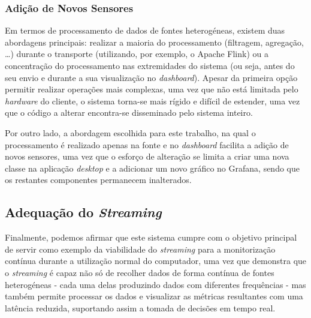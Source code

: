 \subsubsection{Adição de Novos Sensores}

Em termos de processamento de dados de fontes heterogéneas, existem duas abordagens principais: realizar a maioria do processamento (filtragem, agregação, \ldots) durante o transporte (utilizando, por exemplo, o Apache Flink) ou a concentração do processamento nas extremidades do sistema (ou seja, antes do seu envio e durante a sua visualização no \textit{dashboard}).
Apesar da primeira opção permitir realizar operações mais complexas, uma vez que não está limitada pelo \textit{hardware} do cliente, o sistema torna-se mais rígido e difícil de estender, uma vez que o código a alterar encontra-se disseminado pelo sistema inteiro.

Por outro lado, a abordagem escolhida para este trabalho, na qual o processamento é realizado apenas na fonte e no \textit{dashboard} facilita a adição de novos sensores, uma vez que o esforço de alteração se limita a criar uma nova classe na aplicação \textit{desktop} e a adicionar um novo gráfico no Grafana, sendo que os restantes componentes permanecem inalterados.

\subsection{Adequação do \textit{Streaming}}

Finalmente, podemos afirmar que este sistema cumpre com o objetivo principal de servir como exemplo da viabilidade do \textit{streaming} para a monitorização contínua durante a utilização normal do computador, uma vez que demonstra que o \textit{streaming} é capaz não só de recolher dados de forma contínua de fontes heterogéneas - cada uma delas produzindo dados com diferentes frequências - mas também permite processar os dados e visualizar as métricas resultantes com uma latência reduzida, suportando assim a tomada de decisões em tempo real.
